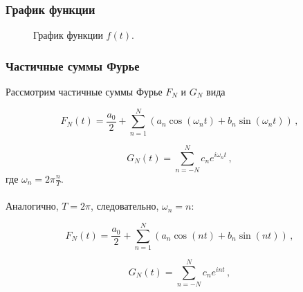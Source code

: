 \documentclass[a5paper, 10pt]{article}
\theoremstyle{definition}
\theoremstyle{plain}
\theoremstyle{remark}
\begin{document}
\subsubsection{График функции}
\begin{figure}[h]
\caption{График функции $f(t)$.}
\end{figure}

\subsubsection{Частичные суммы Фурье}
Рассмотрим частичные суммы Фурье $F_N$ и $G_N$ вида

\begin{equation}
F_N(t) = \frac{a_0}{2} + \sum  \limits_{n=1}^N \left( a_n \cos \left( \omega_n t \right) + b_n \sin \left( \omega_n t \right)  \right) \, ,
\end{equation}

\begin{equation}
G_N (t) = \sum  \limits_{n=-N}^N c_n e^{i \omega_n t} \, ,
\end{equation}
где $\omega_n = 2 \pi \frac{n}{T}$.\\
\\
Аналогично, $T = 2 \pi$, следовательно, $\omega_n = n$:

\begin{equation}
F_N(t) = \frac{a_0}{2} + \sum  \limits_{n=1}^N \left( a_n \cos \left( n t \right) + b_n \sin \left( n t \right)  \right) \, ,
\end{equation}

\begin{equation}
G_N (t) = \sum  \limits_{n=-N}^N c_n e^{i n t} \, ,
\end{equation}
\end{document}
